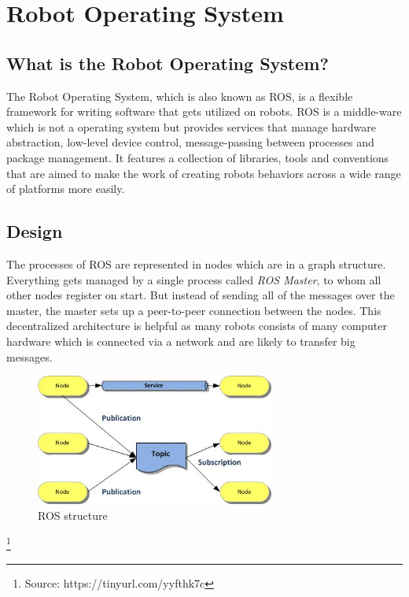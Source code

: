 
\chapter{Robot Operating System\authorA}

\section{What is the Robot Operating System?}
The Robot Operating System, which is also known as ROS, is a flexible framework for writing software that gets utilized on robots. ROS is a middle-ware which is not a operating system but provides services that manage hardware abstraction, low-level device control, message-passing between processes and package management. It features a collection of libraries, tools and conventions that are aimed to make the work of creating robots behaviors across a wide range of platforms more easily. \newline

\section{Design}
The processes of ROS are represented in nodes which are in a graph structure. Everything gets managed by a single process called \textit{ROS Master}, to whom all other nodes register on start. But instead of sending all of the messages over the master, the master sets up a peer-to-peer connection between the nodes. This decentralized architecture is helpful as many robots consists of many computer hardware which is connected via a network and are likely to transfer big messages.   \\
\begin{figure}[H]
	\centering
	\includegraphics[width=0.7\textwidth]{./media/images/ros_structure.jpg}
  	\caption{ROS structure}
  	\label{rosstructure}
\end{figure}
\footnote{Source: https://tinyurl.com/yyfthk7c}

